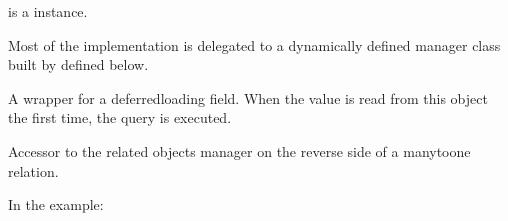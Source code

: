 \documentclass[a4paper,11pt,spanish]{sphinxmanual}
\begin{document}
\begin{fulllineitems}
\begin{fulllineitems}
\begin{sphinxVerbatim}[commandchars=\\\{\}]
       
\end{sphinxVerbatim}

\sphinxAtStartPar
{} is a  instance.

\sphinxAtStartPar
Most of the implementation is delegated to a dynamically defined manager
class built by  defined below.

\end{fulllineitems}


\begin{fulllineitems}
\label{\detokenize{api/inventory/inventory.models:inventory.models.ProductLot.lot_code}}
\pysigstartsignatures
\pysigline
{}
\pysigstopsignatures
\sphinxAtStartPar
A wrapper for a deferred\sphinxhyphen{}loading field. When the value is read from this
object the first time, the query is executed.

\end{fulllineitems}


\begin{fulllineitems}
\label{\detokenize{api/inventory/inventory.models:inventory.models.ProductLot.lotstock_set}}
\pysigstartsignatures
\pysigline
{}
\pysigstopsignatures
\sphinxAtStartPar
Accessor to the related objects manager on the reverse side of a
many\sphinxhyphen{}to\sphinxhyphen{}one relation.

\sphinxAtStartPar
In the example:

\begin{sphinxVerbatim}[commandchars=\\\{\}]
       
\end{sphinxVerbatim}


\end{fulllineitems}
\end{fulllineitems}
\end{document}
